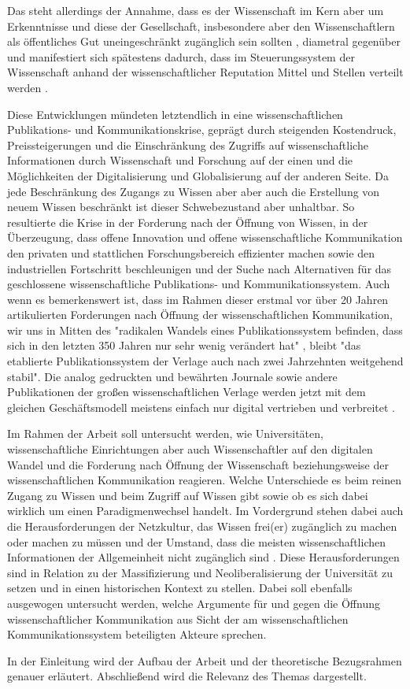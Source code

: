 Das steht allerdings der Annahme, dass es der Wissenschaft im Kern aber um Erkenntnisse und diese der Gesellschaft, insbesondere aber den Wissenschaftlern als öffentliches Gut uneingeschränkt zugänglich sein sollten \cite{hanekop_2006}, diametral gegenüber \cite{offhaus_2012_institutionelle_repos} und manifestiert sich spätestens dadurch, dass im Steuerungssystem der Wissenschaft anhand der wissenschaftlicher Reputation Mittel und Stellen verteilt werden \cite{cite:4}.

Diese Entwicklungen mündeten letztendlich in eine wissenschaftlichen Publikations- und Kommunikationskrise, geprägt durch steigenden Kostendruck, Preissteigerungen und die Einschränkung des Zugriffs auf wissenschaftliche Informationen durch Wissenschaft und Forschung \cite{Hess_2006} auf der einen und die Möglichkeiten der Digitalisierung und Globalisierung auf der anderen Seite. Da jede Beschränkung des Zugangs zu Wissen aber aber auch die Erstellung von neuem Wissen beschränkt \cite{cite:5} \cite{cite:8} ist dieser Schwebezustand aber unhaltbar. So resultierte die Krise in der Forderung nach der Öffnung von Wissen, in der Überzeugung, dass offene Innovation und offene wissenschaftliche Kommunikation den privaten und stattlichen Forschungsbereich effizienter machen sowie den industriellen Fortschritt beschleunigen \cite{cite:7} und der Suche nach Alternativen für das geschlossene wissenschaftliche Publikations- und Kommunikationssystem. Auch wenn es bemerkenswert ist, dass im Rahmen dieser erstmal vor über 20 Jahren artikulierten Forderungen nach Öffnung der wissenschaftlichen Kommunikation, wir uns in Mitten des "radikalen Wandels eines Publikationssystem befinden, dass sich in den letzten 350 Jahren nur sehr wenig verändert hat" \cite{poynder_2011_suber}, bleibt "das etablierte Publikationssystem der Verlage auch nach zwei Jahrzehnten weitgehend stabil"\cite{Hanekop_2014}. Die analog gedruckten und bewährten Journale sowie andere Publikationen der großen wissenschaftlichen Verlage werden jetzt mit dem gleichen Geschäftsmodell meistens einfach nur digital vertrieben und verbreitet \cite{Hanekop_2014} \cite{boai_2012}.

Im Rahmen der Arbeit soll untersucht werden, wie Universitäten, wissenschaftliche Einrichtungen aber auch Wissenschaftler auf den digitalen Wandel und die Forderung nach Öffnung der Wissenschaft beziehungsweise der wissenschaftlichen Kommunikation reagieren. Welche Unterschiede es beim reinen Zugang zu Wissen und beim Zugriff auf Wissen gibt sowie ob es sich dabei wirklich um einen Paradigmenwechsel handelt. Im Vordergrund stehen dabei auch die Herausforderungen der Netzkultur, das Wissen frei(er) zugänglich zu machen oder machen zu müssen und der Umstand, dass die meisten wissenschaftlichen Informationen der Allgemeinheit nicht zugänglich sind \cite{cite:6}. Diese Herausforderungen sind in Relation zu der Massifizierung und Neoliberalisierung der Universität zu setzen und in einen historischen Kontext zu stellen. Dabei soll ebenfalls ausgewogen untersucht werden, welche Argumente für und gegen die Öffnung wissenschaftlicher Kommunikation aus Sicht der am wissenschaftlichen Kommunikationssystem beteiligten Akteure sprechen.

In der Einleitung wird der Aufbau der Arbeit und der theoretische Bezugsrahmen genauer erläutert. Abschließend wird die Relevanz des Themas dargestellt.
